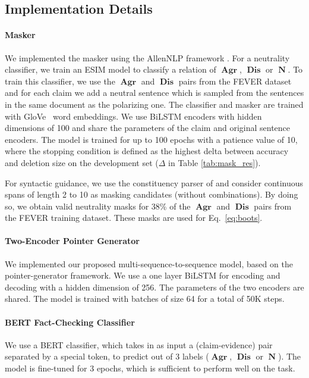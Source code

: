 \documentclass[letterpaper]{article}
\newcommand{\tabref}[1]{Table \ref{#1}}
\renewcommand{\eqref}[1]{Eq.~\ref{#1}}
\DeclareMathOperator{\A}{\boldsymbol{Agr}}
\DeclareMathOperator{\D}{\boldsymbol{Dis}}
\DeclareMathOperator{\N}{\boldsymbol{N}}
\begin{document}
\subsection{Implementation Details}

\paragraph{Masker}
We implemented the masker using the AllenNLP framework \cite{Gardner2017AllenNLP}. For a neutrality classifier, we train an ESIM model \cite{chen2017enhanced} to classify a relation of $\A$, $\D$ or $\N$. To train this classifier, we use the $\A$ and $\D$ pairs from the FEVER dataset and for each claim we add a neutral sentence which is sampled from the sentences in the same document as the polarizing one. The classifier and masker are trained with GloVe~\cite{pennington-etal-2014-glove} word embeddings. We use BiLSTM \cite{sak2014long} encoders with hidden dimensions of 100 and share the parameters of the claim and original sentence encoders. The model is trained for up to 100 epochs with a patience value of 10, where the stopping condition is defined as the highest delta between accuracy and deletion size on the development set ($\Delta$ in \tabref{tab:mask_res}).%

For syntactic guidance, we use the constituency parser of \cite{stern-etal-2017-minimal} and consider continuous spans of length 2 to 10 as masking candidates (without combinations). By doing so, we obtain valid neutrality masks for 38\% of the $\A$ and $\D$ pairs from the FEVER training dataset. These masks are used for \eqref{eq:boots}.

\paragraph{Two-Encoder Pointer Generator}
We implemented our proposed multi-sequence-to-sequence model, based on the pointer-generator framework.%
We use a one layer BiLSTM for encoding and decoding with a hidden dimension of 256. The parameters of the two encoders are shared. The model is trained with batches of size 64 for a total of 50K steps.%

\paragraph{BERT Fact-Checking Classifier}
We use a BERT \cite{devlin2018bert} classifier, which takes in as input a (claim-evidence) pair separated by a special token, to predict out of 3 labels ($\A$, $\D$ or $\N$). The model is fine-tuned for 3 epochs, which is sufficient to perform well on the task.
\end{document}

